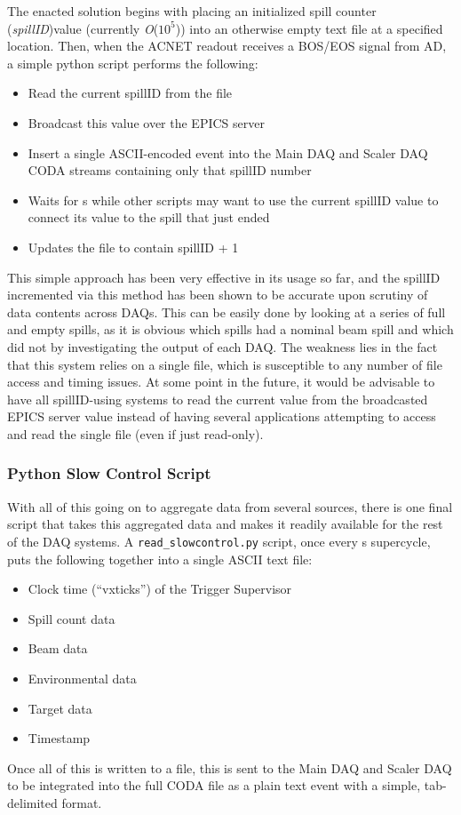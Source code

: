 The enacted solution begins with placing an initialized spill counter (\emph{spillID})value (currently \emph{O}($10^5$)) into an otherwise empty text file at a specified location. Then, when the ACNET readout receives a BOS/EOS signal from AD, a simple python script performs the following:
\begin{itemize}
	\item Read the current spillID from the file
	\item Broadcast this value over the EPICS server
	\item Insert a single ASCII-encoded event into the Main DAQ and Scaler DAQ CODA streams containing only that spillID number
	\item Waits for \unit[20]{s} while other scripts may want to use the current spillID value to connect its value to the spill that just ended
	\item Updates the file to contain spillID + 1
\end{itemize}

This simple approach has been very effective in its usage so far, and the spillID incremented via this method has been shown to be accurate upon scrutiny of data contents across DAQs. This can be easily done by looking at a series of full and empty spills, as it is obvious which spills had a nominal beam spill and which did not by investigating the output of each DAQ. The weakness lies in the fact that this system relies on a single file, which is susceptible to any number of file access and timing issues. At some point in the future, it would be advisable to have all spillID-using systems to read the current value from the broadcasted EPICS server value instead of having several applications attempting to access and read the single file (even if just read-only).

\subsubsection{Python Slow Control Script}

With all of this going on to aggregate data from several sources, there is one final script that takes this aggregated data and makes it readily available for the rest of the DAQ systems. A \verb|read_slowcontrol.py| script, once every \unit[60]{s} supercycle, puts the following together into a single ASCII text file:
\begin{itemize}
	\item Clock time (``vxticks'') of the Trigger Supervisor
	\item Spill count data
	\item Beam data
	\item Environmental data
	\item Target data
	\item Timestamp
\end{itemize}

Once all of this is written to a file, this is sent to the Main DAQ and Scaler DAQ to be integrated into the full CODA file as a plain text event with a simple, tab-delimited format.